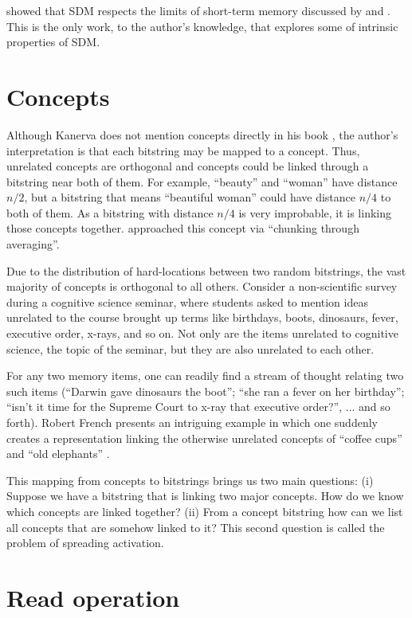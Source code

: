 \citet{Linhares2011} showed that SDM respects the limits of short-term memory discussed by \citet{Miller1955} and \citet{Cowan2001}. This is the only work, to the author's knowledge, that explores some of intrinsic properties of SDM.


\section{Concepts}

Although Kanerva does not mention concepts directly in his book \citep{Kanerva1988}, the author's interpretation is that each bitstring may be mapped to a concept. Thus, unrelated concepts are orthogonal and concepts could be linked through a bitstring near both of them. For example, ``beauty'' and ``woman'' have distance $n/2$, but a bitstring that means ``beautiful woman'' could have distance $n/4$ to both of them. As a bitstring with distance $n/4$ is very improbable, it is linking those concepts together. \citet{Linhares2011} approached this concept via ``chunking through averaging''.

Due to the distribution of hard-locations between two random bitstrings, the vast majority of concepts is orthogonal to all others. Consider a non-scientific survey during a cognitive science seminar, where students asked to mention ideas unrelated to the course brought up terms like birthdays, boots, dinosaurs, fever, executive order, x-rays, and so on. Not only are the items unrelated to cognitive science, the topic of the seminar, but they are also unrelated to each other.

For any two memory items, one can readily find a stream of thought relating two such items (``Darwin gave dinosaurs the boot''; ``she ran a fever on her birthday''; ``isn't it time for the Supreme Court to x-ray that executive order?'', ... and so forth). Robert French presents an intriguing example in which one suddenly creates a representation linking the otherwise unrelated concepts of ``coffee cups'' and ``old elephants'' \citep{French1997}.

This mapping from concepts to bitstrings brings us two main questions: (i) Suppose we have a bitstring that is linking two major concepts.  How do we know which concepts are linked together? (ii) From a concept bitstring how can we list all concepts that are somehow linked to it? This second question is called the problem of spreading activation.


\section{Read operation}

